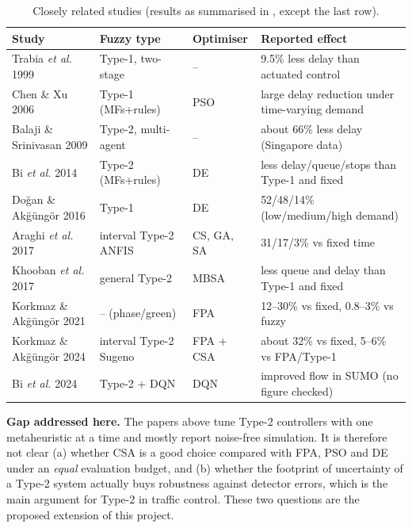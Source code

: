 \begin{table}[t]
\centering\small
\caption{Closely related studies (results as summarised in \cite{ref_paper}, except the last row).}\label{tab:related}
\begin{tabular}{@{}p{3.2cm}p{2.7cm}p{2.1cm}p{5.6cm}@{}}
\toprule
Study & Fuzzy type & Optimiser & Reported effect \\ \midrule
Trabia \emph{et al.} 1999 \cite{trabia1999} & Type-1, two-stage & -- & 9.5\% less delay than actuated control \\
Chen \& Xu 2006 \cite{chen2006} & Type-1 (MFs+rules) & PSO & large delay reduction under time-varying demand \\
Balaji \& Srinivasan 2009 \cite{balaji2009} & Type-2, multi-agent & -- & about 66\% less delay (Singapore data) \\
Bi \emph{et al.} 2014 \cite{bi2014} & Type-2 (MFs+rules) & DE & less delay/queue/stops than Type-1 and fixed \\
Do{\u g}an \& Ak{\"g}{\"u}ng{\"o}r 2016 \cite{dogan2016} & Type-1 & DE & 52/48/14\% (low/medium/high demand) \\
Araghi \emph{et al.} 2017 \cite{araghi2017} & interval Type-2 ANFIS & CS, GA, SA & 31/17/3\% vs fixed time \\
Khooban \emph{et al.} 2017 \cite{khooban2017} & general Type-2 & MBSA & less queue and delay than Type-1 and fixed \\
Korkmaz \& Ak{\"g}{\"u}ng{\"o}r 2021 \cite{korkmaz2021a} & -- (phase/green) & FPA & 12--30\% vs fixed, 0.8--3\% vs fuzzy \\
Korkmaz \& Ak{\"g}{\"u}ng{\"o}r 2024 \cite{ref_paper} & interval Type-2 Sugeno & FPA + CSA & about 32\% vs fixed, 5--6\% vs FPA/Type-1 \\
Bi \emph{et al.} 2024 \cite{bi2024} & Type-2 + DQN & DQN & improved flow in SUMO (no figure checked) \\ \bottomrule
\end{tabular}
\end{table}

\textbf{Gap addressed here.} The papers above tune Type-2 controllers with one metaheuristic at a time and mostly report noise-free
simulation. It is therefore not clear (a) whether CSA is a good choice compared with FPA, PSO and DE under an \emph{equal} evaluation budget,
and (b) whether the footprint of uncertainty of a Type-2 system actually buys robustness against detector errors, which is the main argument
for Type-2 in traffic control. These two questions are the proposed extension of this project.

